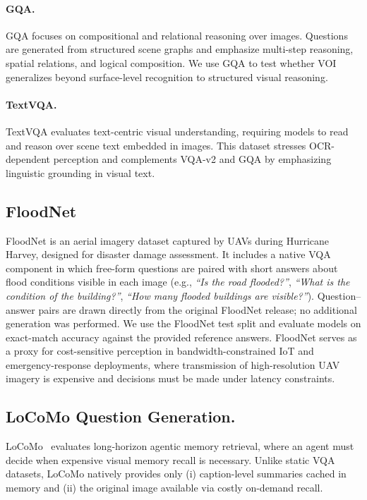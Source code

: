 \paragraph{GQA.}
GQA \cite{hudson2019gqa} focuses on compositional and relational reasoning over images.
Questions are generated from structured scene graphs and emphasize multi-step reasoning, spatial relations, and logical composition.
We use GQA to test whether VOI generalizes beyond surface-level recognition to structured visual reasoning.

\paragraph{TextVQA.}
TextVQA \cite{singh2019textvqa} evaluates text-centric visual understanding, requiring models to read and reason over scene text embedded in images.
This dataset stresses OCR-dependent perception and complements VQA-v2 and GQA by emphasizing linguistic grounding in visual text.

\subsection{FloodNet}
\label{sec:floodnet}
FloodNet \cite{rahnemoonfar2021floodnet} is an aerial imagery dataset captured by UAVs during Hurricane Harvey, designed for disaster damage assessment.
It includes a native VQA component in which free-form questions are paired with short answers about flood conditions visible in each image (e.g., \emph{``Is the road flooded?''}, \emph{``What is the condition of the building?''}, \emph{``How many flooded buildings are visible?''}).
Question--answer pairs are drawn directly from the original FloodNet release; no additional generation was performed.
We use the FloodNet test split and evaluate models on exact-match accuracy against the provided reference answers.
FloodNet serves as a proxy for cost-sensitive perception in bandwidth-constrained IoT and emergency-response deployments, where transmission of high-resolution UAV imagery is expensive and decisions must be made under latency constraints.

\subsection{LoCoMo Question Generation.}
\label{sec:locomo}
LoCoMo~\cite{wang2024locomo} evaluates long-horizon agentic memory retrieval, where an agent must decide when expensive visual memory recall is necessary.
Unlike static VQA datasets, LoCoMo natively provides only (i) caption-level summaries cached in memory and (ii) the original image available via costly on-demand recall.

